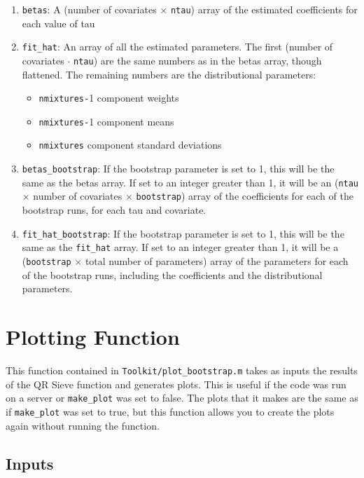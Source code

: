 \documentclass[12pt]{article}
\begin{document}
\begin{enumerate}
    \item \lstinline{betas}: A (number of covariates $\times$ \lstinline{ntau}) array of the estimated coefficients for each value of tau
    \item \lstinline{fit_hat}: An array of all the estimated parameters. The first (number of covariates $\cdot$ \lstinline{ntau}) are the same numbers as in the betas array, though flattened. The remaining numbers are the distributional parameters:
    \begin{itemize}
        \item \lstinline{nmixtures-}1 component weights
        \item \lstinline{nmixtures-}1 component means
        \item \lstinline{nmixtures} component standard deviations
    \end{itemize}
    \item \lstinline{betas_bootstrap}: If the bootstrap parameter is set to 1, this will be the same as the betas array. If set to an integer greater than 1, it will be an (\lstinline{ntau} $\times$ number of covariates $\times$ \lstinline{bootstrap}) array of the coefficients for each of the bootstrap runs, for each tau and covariate.
    \item \lstinline{fit_hat_bootstrap}: If the bootstrap parameter is set to 1, this will be the same as the \lstinline{fit_hat} array. If set to an integer greater than 1, it will be a (\lstinline{bootstrap} $\times$ total number of parameters) array of the parameters for each of the bootstrap runs, including the coefficients and the distributional parameters.
\end{enumerate}

\section{Plotting Function}

This function contained in \lstinline{Toolkit/plot_bootstrap.m} takes as inputs the results of the QR Sieve function and generates plots. This is useful if the code was run on a server or \lstinline{make_plot} was set to false. The plots that it makes are the same as if \lstinline{make_plot} was set to true, but this function allows you to create the plots again without running the function.

\subsection{Inputs}
\end{document}
